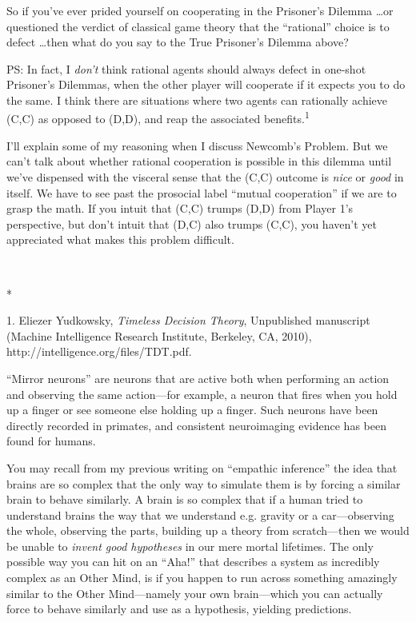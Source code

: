 {
 So if you've ever prided yourself on cooperating
in the Prisoner's Dilemma \ldots or questioned the
verdict of classical game theory that the
``rational'' choice is to defect
\ldots then what do you say to the True Prisoner's
Dilemma above?}

{
 PS: In fact, I \textit{don't} think rational
agents should always defect in one-shot Prisoner's
Dilemmas, when the other player will cooperate if it expects you to do
the same. I think there are situations where two agents can rationally
achieve (C,C) as opposed to (D,D), and reap the associated
benefits.\textsuperscript{1}}

{
 I'll explain some of my reasoning when I discuss
Newcomb's Problem. But we can't talk
about whether rational cooperation is possible in this dilemma until
we've dispensed with the visceral sense that the (C,C)
outcome is \textit{nice} or \textit{good} in itself. We have to see
past the prosocial label ``mutual
cooperation'' if we are to grasp the math. If you
intuit that (C,C) trumps (D,D) from Player 1's
perspective, but don't intuit that (D,C) also trumps
(C,C), you haven't yet appreciated what makes this
problem difficult.}

{\centering
 \ ~
\par}

{\centering
 *
\par}


\bigskip

{
 1. Eliezer Yudkowsky, \textit{Timeless Decision Theory},
Unpublished manuscript (Machine Intelligence Research Institute,
Berkeley, CA, 2010), http://intelligence.org/files/TDT.pdf.}


{
 ``Mirror neurons'' are neurons
that are active both when performing an action and observing the same
action---for example, a neuron that fires when you hold up a finger or
see someone else holding up a finger. Such neurons have been directly
recorded in primates, and consistent neuroimaging evidence has been
found for humans. }

{
 You may recall from my previous writing on
``empathic inference'' the idea that
brains are so complex that the only way to simulate them is by forcing
a similar brain to behave similarly. A brain is so complex that if a
human tried to understand brains the way that we understand e.g.
gravity or a car---observing the whole, observing the parts, building
up a theory from scratch---then we would be unable to \textit{invent
good hypotheses} in our mere mortal lifetimes. The only possible way
you can hit on an ``Aha!'' that
describes a system as incredibly complex as an Other Mind, is if you
happen to run across something amazingly similar to the Other
Mind---namely your own brain---which you can actually force to behave
similarly and use as a hypothesis, yielding predictions.}

